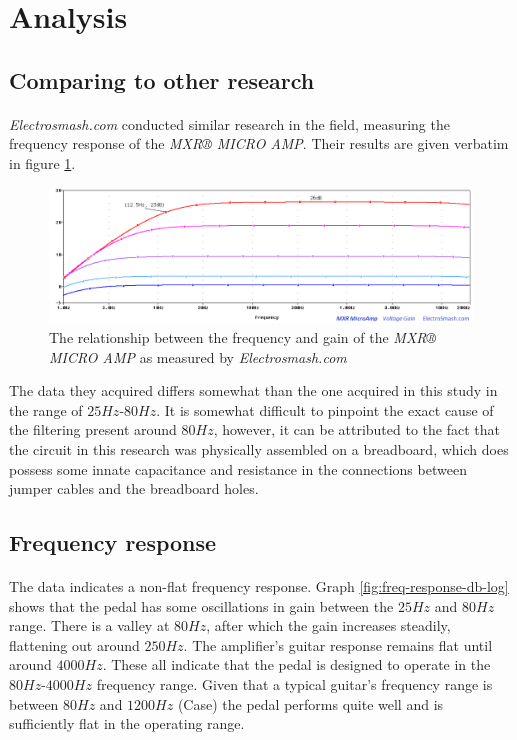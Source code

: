 \documentclass[a4paper, 12pt]{article}
\begin{document}
\section{Analysis}

\subsection{Comparing to other research}
\paragraph*{}
\textit{Electrosmash.com} conducted similar research in the field, measuring 
the frequency response of the \textit{MXR® MICRO AMP}. Their results are given 
verbatim in figure \ref{fig:freq-response-db-log-electrosmash}.
\begin{figure}[ht]
	\centering
	\includegraphics[width=\textwidth]{img/freq-response-db-log-electrosmash}
	\caption{The relationship between the frequency and gain of the 
	\textit{MXR® MICRO AMP} as measured by \textit{Electrosmash.com}}
	\label{fig:freq-response-db-log-electrosmash}
\end{figure}
The data they acquired differs somewhat than the one acquired in this study 
in the range of $25\si{Hz}$-$80\si{Hz}$. It is somewhat difficult to pinpoint 
the exact cause of the filtering present around $80\si{Hz}$, however, it can 
be attributed to the fact that the circuit in this research was physically 
assembled on a breadboard, which does possess some innate capacitance and 
resistance in the connections between jumper cables and the breadboard holes.

\subsection{Frequency response}
\paragraph*{}
The data indicates a non-flat frequency response. Graph 
\ref{fig:freq-response-db-log} shows that the pedal has some oscillations in 
gain between the $25\si{Hz}$ and $80\si{Hz}$ range. There is a valley at 
$80\si{Hz}$, after which the gain increases steadily, flattening out around 
$250\si{Hz}$. The amplifier's guitar response remains flat until around 
$4000\si{Hz}$. These all indicate that the pedal is designed to operate in 
the $80\si{Hz}$-$4000\si{Hz}$ frequency range. Given that a typical guitar's 
frequency range is between $80\si{Hz}$ and $1200\si{Hz}$ (Case) the pedal 
performs quite well and is sufficiently flat in the operating range.
\end{document}
